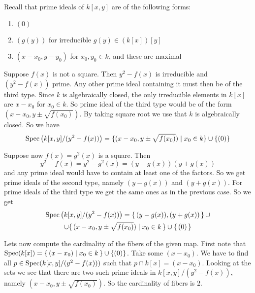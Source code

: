\begin{exercise}{2}
    Recall that prime ideals of $k[x, y]$ are of the following forms:
    \begin{enumerate}
        \item $(0)$
        \item $(g(y))$ for irreducible $g(y) \in (k[x])[y]$
        \item $(x - x_0, y - y_0)$ for $x_0, y_0 \in k$, and these are maximal
    \end{enumerate}

    Suppose $f(x)$ is not a square. Then $y^2 - f(x)$ is irreducible and $(y^2 -
    f(x))$ prime. Any other prime ideal containing it must then be of the third
    type. Since $k$ is algebraically closed, the only irreducible elements in
    $k[x]$ are $x - x_0$ for $x_0 \in k$. So prime ideal of the third type would
    be of the form $(x - x_0, y \pm \sqrt{f(x_0)})$. By taking square root we
    use that $k$ is algebraically closed.
    So we have
    \begin{equation*}
        \operatorname{Spec}\left(k[x, y] / (y^2 - f(x))\right) = \{ (x - x_0, y \pm
        \sqrt{f(x_0)}) \mid x_0 \in k \} \cup \{ (0) \}
    \end{equation*}

    Suppose now $f(x) = g^2(x)$ is a square. Then
    \begin{equation*}
        y^2 - f(x) = y^2 - g^2(x) = (y - g(x)) (y + g(x))
    \end{equation*}
    and any prime ideal would have to contain at least one of the factors. So we
    get prime ideals of the second type, namely $(y - g(x))$ and $(y + g(x))$.
    For prime ideals of the third type we get the same ones as in the previous
    case. So we get
    \begin{multline*}
        \operatorname{Spec}\left(k[x, y] / (y^2 - f(x))\right) = \{\, (y - g(x)), (y + g(x))
        \,\}\,\cup \\ \cup \{\, (x - x_0, y \pm \sqrt{f(x_0)}) \mid x_0 \in k \,\} \cup
        \{\,(0)\,\}
    \end{multline*}

    Lets now compute the cardinality of the fibers of the given map. First note
    that $\operatorname{Spec}(k[x]) = \{\, (x - x_0) \mid x_0 \in k \,\} \cup \{ (0) \}$. Take
    some $(x - x_0)$. We have to find all $p \in \operatorname{Spec}(k[x, y]/(y^2 - f(x)))$
    such that $p \cap k[x] = (x - x_0)$. Looking at the sets we see that there
    are two such prime ideals in $k[x, y] / (y^2 - f(x))$, namely $(x - x_0, y
    \pm \sqrt{f(x_0)})$. So the cardinality of fibers is $2$.
\end{exercise}


